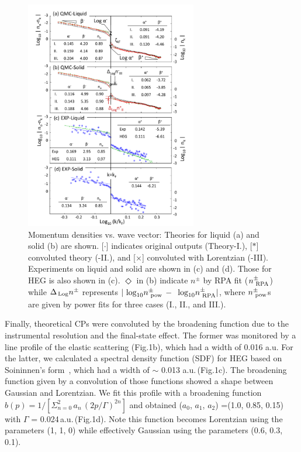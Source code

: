 \documentclass[twocolumn,showpacs,showkeys,fleqn,prl,superscriptaddress]{revtex4}%
\newcommand{\nn}[1]{\textnormal{ #1}}
\begin{document}
\begin{figure}
\includegraphics[bb= 70 10 500 700, width=7.5cm]{fig3.pdf}
\caption{Momentum densities vs. wave vector:  Theories for liquid (a) and solid (b) are shown. [$\cdot$] indicates original outputs (Theory-I.), [$*$]  convoluted theory (-II.), and [$\times$] convoluted with Lorentzian (-III).  Experiments on liquid and solid are shown in (c) and (d). Those for HEG is also shown in (c).
 $\Diamond$ in (b) indicate $n^{\pm}$ by RPA fit ($n^{\pm}_{\nn{RPA}}$)  
while $\Delta_{\!\nn{Log}} n^{\pm}$ represents $ | \nn{log}_{10} n^{\pm}_{\nn{pow}} \,-\, \nn{log}_{10} n^{\pm}_{\nn{RPA}} | $,
where $ n^{\pm}_{\nn{pow}} $s are given by power fits for three cases (I., II., and III.).
} 
\label{Fig.3}
\end{figure}

Finally, theoretical CPs were convoluted by the broadening function due to the instrumental resolution and the final-state effect.
The former was monitored by a line profile of the elastic scattering (Fig.1b), which had a width of 0.016 a.u.
For the latter, we calculated a spectral density function (SDF) for HEG based on Soininnen's form~\cite{soi01}, which had a width of $\sim$ 0.013 a.u.\,(Fig.1c).
The broadening function given by a convolution of those functions showed a shape between Gaussian and Lorentzian.
We fit this profile with a broadening function $b(p) =1/ [ \Sigma_{n=0}^{2}\,a_n\,(2p / \Gamma )^{2n} ]$ and obtained ($a_0$, $a_1$, $a_2$) =(1.0, 0.85, 0.15) with $\Gamma$ = 0.024\,a.u.\,(Fig.1d).
Note this function becomes Lorentzian using the parameters (1, 1, 0) while effectively Gaussian using the parameters (0.6, 0.3, 0.1).
\end{document}
